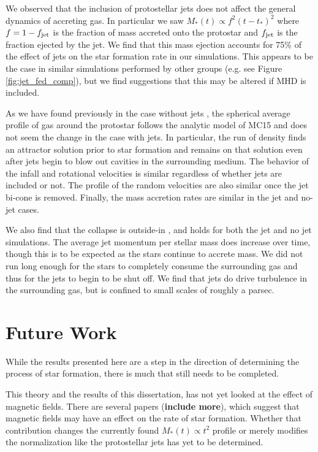 \documentclass[../dissertation.tex]{subfiles}
\begin{document}
We observed that the inclusion of protostellar jets does not affect the general dynamics of accreting gas.
In particular we saw $M_*(t) \propto f^2 (t-t_*)^2$ where $f = 1 - f_{\rm jet}$ is the fraction of mass accreted onto the protostar and $f_{\rm jet}$ is the fraction ejected by the jet.
We find that this mass ejection accounts for 75\% of the effect of jets on the star formation rate in our simulations.
This appears to be the case in similar simulations performed by other groups (e.g. see Figure \ref{fig:jet_fed_comp}), but we find suggestions that this may be altered if MHD is included.

As we have found previously in the case without jets \citep{2017MNRAS.465.1316M}, the spherical average profile of gas around the protostar follows the analytic model of MC15 and does not seem the change in the case with jets.  In particular, the run of density finds an attractor solution prior to star formation and remains on that solution even after jets begin to blow out cavities in the surrounding medium.
The behavior of the infall and rotational velocities is similar regardless of whether jets are included or not.
The profile of the random velocities are also similar once the jet bi-cone is removed.  Finally, the mass accretion rates are similar in the jet and no-jet cases.

We also find that the collapse is outside-in  \citep{2017MNRAS.465.1316M}, and holds for both the jet and no jet simulations.
The average jet momentum per stellar mass does increase over time, though this is to be expected as the stars continue to accrete mass.
We did not run long enough for the stars to completely consume the surrounding gas and thus for the jets to begin to be shut off.
We find that jets do drive turbulence in the surrounding gas, but is confined to small scales of roughly a parsec.

\section{Future Work}
While the results presented here are a step in the direction of determining the process of star formation, there is much that still needs to be completed. 

This theory and the results of this dissertation, has not yet looked at the effect of magnetic fields. 
There are several papers \citet{2017ApJ...838...40M} ({\bf include more}), which suggest that magnetic fields may have an effect on the rate of star formation. 
Whether that contribution changes the currently found $M_*(t) \propto t^2$ profile or merely modifies the normalization like the protostellar jets has yet to be determined. 
\end{document}
